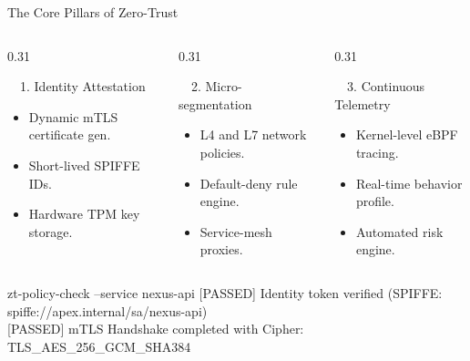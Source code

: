 \documentclass[aspectratio=169, 10pt]{beamer}
\begin{document}
\begin{frame}{The Core Pillars of Zero-Trust}
  \begin{columns}[T]
    \begin{column}{0.31\textwidth}
      \begin{cybercard}{\faUserCheck\ \ 1. Identity Attestation}
        \begin{itemize}
          \item Dynamic mTLS certificate gen.
          \item Short-lived SPIFFE IDs.
          \item Hardware TPM key storage.
        \end{itemize}
      \end{cybercard}
    \end{column}

    \begin{column}{0.31\textwidth}
      \begin{cybercard}{\faNetworkWired\ \ 2. Micro-segmentation}
        \begin{itemize}
          \item L4 and L7 network policies.
          \item Default-deny rule engine.
          \item Service-mesh proxies.
        \end{itemize}
      \end{cybercard}
    \end{column}

    \begin{column}{0.31\textwidth}
      \begin{cybercard}{\faSearch\ \ 3. Continuous Telemetry}
        \begin{itemize}
          \item Kernel-level eBPF tracing.
          \item Real-time behavior profile.
          \item Automated risk engine.
        \end{itemize}
      \end{cybercard}
    \end{column}
  \end{columns}

  \vspace{6pt}
  \begin{terminalbox}{zt-policy-check --service nexus-api}
    {\ttfamily\color{cybergreen}\small [PASSED] Identity token verified (SPIFFE: spiffe://apex.internal/sa/nexus-api)}\\[1pt]
    {\ttfamily\color{cybergreen}\small [PASSED] mTLS Handshake completed with Cipher: TLS\_AES\_256\_GCM\_SHA384}
  \end{terminalbox}
\end{frame}
\end{document}
